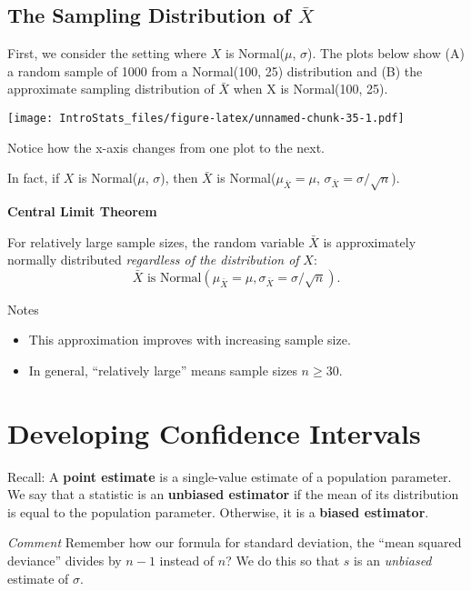 \documentclass[
]{book}
\providecommand{\tightlist}{%
  \setlength{\itemsep}{0pt}\setlength{\parskip}{0pt}}
\begin{document}
\hypertarget{the-sampling-distribution-of-barx}{%
\subsection{\texorpdfstring{The Sampling Distribution of \(\bar{X}\)}{The Sampling Distribution of \textbackslash bar\{X\}}}\label{the-sampling-distribution-of-barx}}

First, we consider the setting where \(X\) is Normal(\(\mu\), \(\sigma\)). The plots below show (A) a random sample of 1000 from a Normal(100, 25) distribution and (B) the approximate sampling distribution of \(\bar{X}\) when X is Normal(100, 25).

\texttt{[image: IntroStats\_files/figure-latex/unnamed-chunk-35-1.pdf]}

Notice how the x-axis changes from one plot to the next.

In fact, if \(X\) is Normal(\(\mu\), \(\sigma\)), then \(\bar{X}\) is Normal(\(\mu_{\bar{X}}=\mu\), \(\sigma_{\bar{X}}=\sigma/\sqrt{n}\)).

\textbf{Central Limit Theorem}

For relatively large sample sizes, the random variable \(\bar{X}\) is approximately normally distributed \emph{regardless of the distribution of} \(X\): \[\bar{X}\text{ is Normal}(\mu_{\bar{X}}=\mu, \sigma_{\bar{X}}=\sigma/\sqrt{n}).\]

Notes

\begin{itemize}
\tightlist
\item
  This approximation improves with increasing sample size.
\item
  In general, ``relatively large'' means sample sizes \(n \ge 30\).
\end{itemize}

\hypertarget{developing-confidence-intervals}{%
\section{Developing Confidence Intervals}\label{developing-confidence-intervals}}

Recall: A \textbf{point estimate} is a single-value estimate of a population parameter. We say that a statistic is an \textbf{unbiased estimator} if the mean of its distribution is equal to the population parameter. Otherwise, it is a \textbf{biased estimator}.

\emph{Comment} Remember how our formula for standard deviation, the ``mean squared deviance'' divides by \(n-1\) instead of \(n\)? We do this so that \(s\) is an \emph{unbiased} estimate of \(\sigma\).
\end{document}
